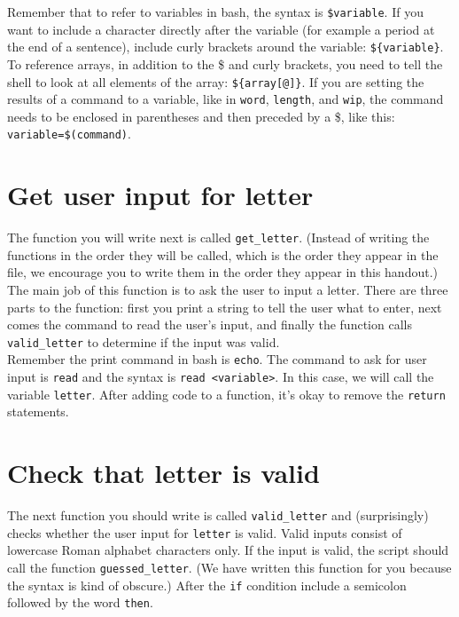 \documentclass{article}
\begin{document}
Remember that to refer to variables in bash, the syntax is \verb|$variable|. If you want to include a character directly after the variable (for example a period at the end of a sentence), include curly brackets around the variable: \verb|${variable}|. To reference arrays, in addition to the \$ and curly brackets, you need to tell the shell to look at all elements of the array: \verb|${array[@]}|. If you are setting the results of a command to a variable, like in \verb|word|, \verb|length|, and \verb|wip|, the command needs to be enclosed in parentheses and then preceded by a \$, like this: \verb|variable=$(command)|.



\section*{Get user input for letter}

\indent\indent The function you will write next is called \verb|get_letter|. (Instead of writing the functions in the order they will be called, which is the order they appear in the file, we encourage you to write them in the order they appear in this handout.) The main job of this function is to ask the user to input a letter. There are three parts to the function: first you print a string to tell the user what to enter, next comes the command to read the user's input, and finally the function calls \verb|valid_letter| to determine if the input was valid. \\

Remember the print command in bash is \verb|echo|. The command to ask for user input is \verb|read| and the syntax is \verb|read <variable>|. In this case, we will call the variable \verb|letter|. After adding code to a function, it's okay to remove the \verb|return| statements.



\section*{Check that letter is valid}

\indent\indent The next function you should write is called \verb|valid_letter| and (surprisingly) checks whether the user input for \verb|letter| is valid. 
Valid inputs consist of lowercase Roman alphabet characters only. If the input is valid, the script should call the function \verb|guessed_letter|. (We have written this function for you because the syntax is kind of obscure.) After the \verb|if| condition include a semicolon followed by the word \verb|then|. \\ 
\end{document}
